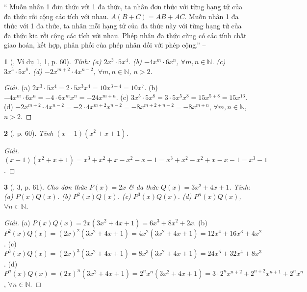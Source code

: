 \documentclass{article}
\newtheorem{baitoan}{}
\begin{document}
`` Muốn nhân 1 đơn thức với 1 đa thức, ta nhân đơn thức với từng hạng tử của đa thức rồi cộng các tích với nhau. $A(B + C) = AB + AC$.  Muốn nhân 1 đa thức với 1 đa thức, ta nhân mỗi hạng tử của đa thức này với từng hạng tử của đa thức kia rồi cộng các tích với nhau.  Phép nhân đa thức cũng có các tính chất giao hoán, kết hợp, phân phối của phép nhân đối với phép cộng.'' -- \cite[Chap. III, \S4, p. 43]{Tuyen_Toan_7}

\begin{baitoan}[\cite{SGK_Toan_7_Canh_Dieu_tap_2}, Ví dụ 1, 1, p. 60]
	Tính: (a) $2x^3\cdot5x^4$. (b) $-4x^m\cdot6x^n$, $\forall m,n\in\mathbb{N}$. (c) $3x^5\cdot5x^8$. (d) $-2x^{m+2}\cdot4x^{n-2}$, $\forall m,n\in\mathbb{N}$, $n > 2$.
\end{baitoan}

\begin{proof}[Giải]
	(a) $2x^3\cdot5x^4 = 2\cdot5x^3x^4 = 10x^{3+4} = 10x^7$. (b) $-4x^m\cdot6x^n = -4\cdot6x^mx^n = -24x^{m+n}$. (c) $3x^5\cdot5x^8 = 3\cdot5x^5x^8 = 15x^{5+8} = 15x^{13}$. (d) $-2x^{m+2}\cdot4x^{n-2} = -2\cdot4x^{m+2}x^{n-2} = -8x^{m+2+n-2} = -8x^{m+n}$, $\forall m,n\in\mathbb{N}$, $n > 2$.
\end{proof}

\begin{baitoan}[\cite{SGK_Toan_7_Canh_Dieu_tap_2}, p. 60]
	Tính $(x - 1)(x^2 + x + 1)$.
\end{baitoan}

\begin{proof}[Giải]
	$(x - 1)(x^2 + x + 1) = x^3 + x^2 + x - x^2 - x - 1 = x^3 + x^2 - x^2 + x - x - 1 = x^3 - 1$.
\end{proof}

\begin{baitoan}[\cite{SGK_Toan_7_Canh_Dieu_tap_2}, 3, p. 61]
	Cho đơn thức $P(x) = 2x$ \& đa thức $Q(x) = 3x^2 + 4x + 1$. Tính: (a) $P(x)Q(x)$. (b) $P^2(x)Q(x)$. (c) $P^3(x)Q(x)$. (d) $P^n(x)Q(x)$, $\forall n\in\mathbb{N}$.
\end{baitoan}

\begin{proof}[Giải]
	(a) $P(x)Q(x) = 2x(3x^2 + 4x + 1) = 6x^3 + 8x^2 + 2x$. (b) $P^2(x)Q(x) = (2x)^2(3x^2 + 4x + 1) = 4x^2(3x^2 + 4x + 1) = 12x^4 + 16x^3 + 4x^2$. (c) $P^3(x)Q(x) = (2x)^3(3x^2 + 4x + 1) = 8x^3(3x^2 + 4x + 1) = 24x^5 + 32x^4 + 8x^3$. (d)  $P^n(x)Q(x) = (2x)^n(3x^2 + 4x + 1) = 2^nx^n(3x^2 + 4x + 1) = 3\cdot2^nx^{n+2} + 2^{n+2}x^{n+1} + 2^nx^n$, $\forall n\in\mathbb{N}$.
\end{proof}
\end{document}
